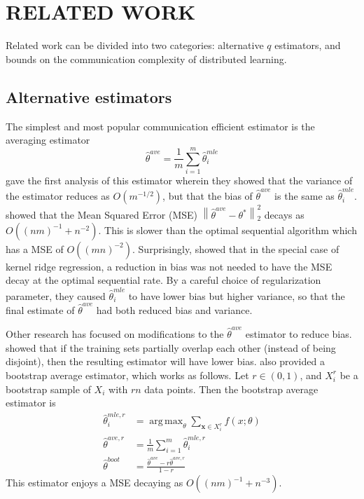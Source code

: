 \documentclass[twoside]{article}
\DeclareMathOperator*{\argmax}{arg\,max}
\newcommand{\x}{\mathbf{x}}
\newcommand{\w}{\theta}
\newcommand{\wave}{\hat\w^{ave}}
\newcommand{\waver}{\hat\w^{ave,r}}
\newcommand{\wboot}{\hat\w^{boot}}
\newcommand{\wmle}{\hat\w^{mle}}
\newcommand{\wmler}{\hat\w^{mle,r}}
\newcommand{\wstar}{{\w^{*}}}
\newcommand{\ltwo}[1]{{\left\lVert {#1} \right\rVert}_2}
\begin{document}
\clearpage

\section{RELATED WORK}

Related work can be divided into two categories:
alternative $q$ estimators,
and bounds on the communication complexity of distributed learning.

\subsection{Alternative estimators}
The simplest and most popular communication efficient estimator is the averaging estimator
\begin{equation}
\wave = \frac{1}{m}\sum_{i=1}^m \wmle_i
\end{equation}
\cite{mcdonald2009efficient}
 gave the first analysis of this estimator wherein they showed that the variance of the estimator reduces as $O(m^{-1/2})$, but that the bias of $\wave$ is the same as $\wmle_i$.
\cite{zhang2012communication} showed that the Mean Squared Error (MSE) $\ltwo{\wave-\wstar}^2$ decays as $O((nm)^{-1} + n^{-2})$.
This is slower than the optimal sequential algorithm which has a MSE of $O((mn)^{-2})$.
Surprisingly, \cite{zhang2013divide} showed that in the special case of kernel ridge regression, a reduction in bias was not needed to have the MSE decay at the optimal sequential rate.
By a careful choice of regularization parameter, they caused $\wmle_i$ to have lower bias but higher variance, so that the final estimate of $\wave$ had both reduced bias and variance.

Other research has focused on modifications to the $\wave$ estimator to reduce bias.
\cite{zinkevich2010parallelized} showed that if the training sets partially overlap each other (instead of being disjoint), then the resulting estimator will have lower bias.
\cite{zhang2012communication} also provided a bootstrap average estimator,
which works as follows.
Let $r\in(0,1)$, and $X_i^r$ be a bootstrap sample of $X_i$ with $rn$ data points.
Then the bootstrap average estimator is
\begin{equation}
\begin{aligned}
\wmler_i &= \argmax_\w \sum_{\x\in X_i^r} f(x;\w)
\\
\waver &= \frac{1}{m}\sum_{i=1}^m \wmler_i
\\
\wboot & = \frac{\wave-r\waver}{1-r}
\end{aligned}
\end{equation}
This estimator enjoys a MSE decaying as $O((nm)^{-1}+n^{-3})$.
\end{document}
